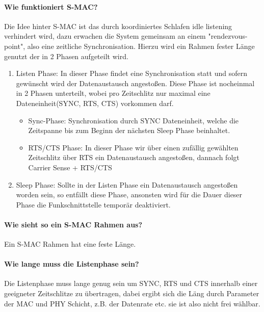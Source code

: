 	\paragraph{Wie funktioniert S-MAC?} 
	Die Idee hinter S-MAC ist das durch koordiniertes Schlafen idle listening verhindert wird, dazu erwachen die System gemeinsam an einem "rendezvous-point", also eine zeitliche Synchronisation.
	Hierzu wird ein Rahmen fester Länge genutzt der in 2 Phasen aufgeteilt wird.
	\begin{enumerate}
		\item Listen Phase: In dieser Phase findet eine Synchronisation statt und sofern gewünscht wird der Datenaustausch angestoßen. Diese Phase ist nocheinmal in 2 Phasen unterteilt, wobei pro Zeitschlitz nur maximal eine Dateneinheit(SYNC, RTS, CTS) vorkommen darf.
		\begin{itemize}
			\item Sync-Phase: Synchronisation durch SYNC Dateneinheit, welche die Zeitspanne bis zum Beginn der nächsten Sleep Phase beinhaltet.
			\item RTS/CTS Phase: In dieser Phase wir über einen zufällig gewählten Zeitschlitz über RTS ein Datenaustausch angestoßen, dannach folgt Carrier Sense + RTS/CTS 
		\end{itemize}
		\item Sleep Phase: Sollte in der Listen Phase ein Datenaustausch angestoßen worden sein, so entfällt diese Phase, ansonsten wird für die Dauer dieser Phase die Funkschnittstelle temporär deaktiviert.
	\end{enumerate}
	
	\paragraph{Wie sieht so ein S-MAC Rahmen aus?}
	Ein S-MAC Rahmen hat eine feste Länge.
	
	\begin{figure}[H]
	\centering
	\end{figure}
	
	\paragraph{Wie lange muss die Listenphase sein?}
	Die Listenphase muss lange genug sein um SYNC, RTS und CTS innerhalb einer geeigneter Zeitschlitze zu übertragen, dabei ergibt sich die Läng durch Parameter der MAC und PHY Schicht, z.B. der Datenrate etc. sie ist also nicht frei wählbar.
	
